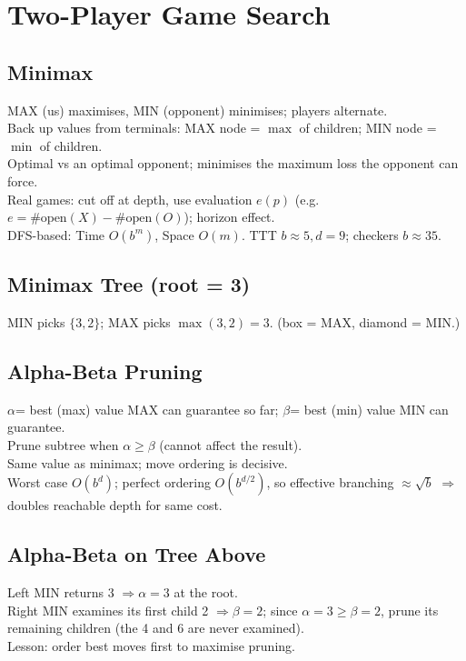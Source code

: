 \section{Two-Player Game Search}

\subsection*{Minimax}
MAX (us) maximises, MIN (opponent) minimises; players alternate.\\
Back up values from terminals: MAX node = \(\max\) of children; MIN node = \(\min\) of children.\\
Optimal vs an optimal opponent; minimises the maximum loss the opponent can force.\\
Real games: cut off at depth, use evaluation \(e(p)\) (e.g. \( e=\#\text{open}(X)-\#\text{open}(O) \)); horizon effect.\\
DFS-based: Time \( O(b^m) \), Space \( O(m) \). TTT \(b\!\approx\!5,d\!=\!9\); checkers \(b\!\approx\!35\).

\subsection*{Minimax Tree (root = 3)}
MIN picks \(\{3,2\}\); MAX picks \(\max(3,2)=3\). (box = MAX, diamond = MIN.)

\subsection*{Alpha-Beta Pruning}
\( \alpha \)= best (max) value MAX can guarantee so far; \( \beta \)= best (min) value MIN can guarantee.\\
Prune subtree when \( \alpha\ge\beta \) (cannot affect the result).\\
Same value as minimax; move ordering is decisive.\\
Worst case \( O(b^d) \); perfect ordering \( O(b^{d/2}) \), so effective branching \( \approx\sqrt{b} \) \(\Rightarrow\) doubles reachable depth for same cost.

\subsection*{Alpha-Beta on Tree Above}
Left MIN returns 3 \(\Rightarrow \alpha=3\) at the root.\\
Right MIN examines its first child 2 \(\Rightarrow \beta=2\); since \(\alpha=3\ge\beta=2\), prune its remaining children (the 4 and 6 are never examined).\\
Lesson: order best moves first to maximise pruning.
